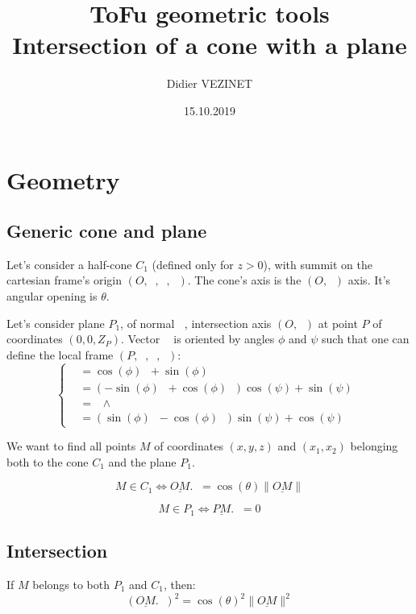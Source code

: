\documentclass[a4paper,11pt,twoside,titlepage,openright]{book}
\numberwithin{equation}{section}
\newcommand{\lt}{\left}
\newcommand{\rt}{\right}
\DeclareMathOperator{\n}{\underline{n}}
\DeclareMathOperator{\ei}{\underline{e}_1}
\DeclareMathOperator{\et}{\underline{e}_2}
\DeclareMathOperator{\ex}{\underline{e}_x}
\DeclareMathOperator{\ey}{\underline{e}_y}
\DeclareMathOperator{\ez}{\underline{e}_z}
\newcommand{\wdg}{\wedge}
\begin{document}
\title{ToFu geometric tools\\ Intersection of a cone with a plane}
\author{Didier VEZINET}
\date{15.10.2019}
\maketitle

\tableofcontents

\chapter{Geometry}
\label{chap:Geometry}

\section{Generic cone and plane}

Let's consider a half-cone $C_1$ (defined only for $z > 0$), with summit on the cartesian frame's origin $(O, \ex, \ey, \ez)$.
The cone's axis is the $(O,\ez)$ axis.
It's angular opening is $\theta$.

Let's consider plane $P_1$, of normal $\n$, intersection axis $(O,\ez)$ at point $P$ of coordinates $(0,0,Z_P)$.
Vector $\n$ is oriented by angles $\phi$ and $\psi$ such that one can define the local frame $(P, \ei, \et, \n)$:
$$
\lt\{
	\begin{array}{ll}
		\ei & = \cos(\phi)\ex + \sin(\phi)\ey\\
		\et & = \lt(-\sin(\phi)\ex + \cos(\phi)\ey\rt)\cos(\psi) + \sin(\psi)\ez\\
		\n & = \ei \wdg \et\\
		   & = \lt( \sin(\phi)\ex - \cos(\phi)\ey \rt)\sin(\psi) + \cos(\psi)\ez
	\end{array}
\rt.
$$

We want to find all points $M$ of coordinates $(x, y, z)$ and $(x_1, x_2)$ belonging both to the cone $C_1$ and the plane $P_1$.

$$
M \in C_1 \Leftrightarrow \underline{OM}.\ez = \cos(\theta) \|\underline{OM}\|
$$

$$
M \in P_1 \Leftrightarrow \underline{PM}.\n = 0
$$


\section{Intersection}

If $M$ belongs to both $P_1$ and $C_1$, then:
$$
(\underline{OM}.\ez)^2 = \cos(\theta)^2 \|\underline{OM}\|^2
$$
\end{document}
